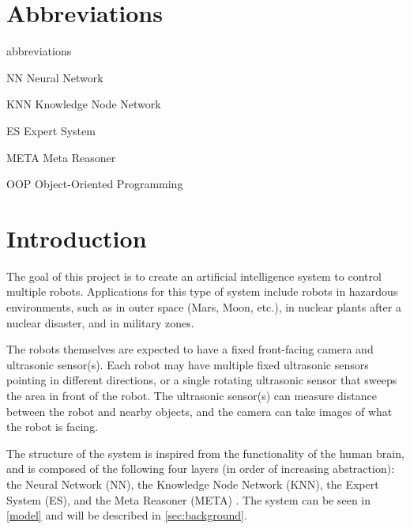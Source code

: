 \documentclass[titlepage,11pt]{article}
\begin{document}
\clearpage
\tableofcontents

\listoffigures
\listoftables
\lstlistoflistings
\clearpage

\twocolumn

\section*{Abbreviations}

\begin{labeling}{abbreviations}
\item [NN] Neural Network
\item [KNN] Knowledge Node Network
\item [ES] Expert System
\item [META] Meta Reasoner
\item [OOP] Object-Oriented Programming
\end{labeling}

\section{Introduction} \label{sec:intro}

The goal of this project is to create an artificial intelligence system to control multiple robots. Applications for this type of system include robots in hazardous environments, such as in outer space (Mars, Moon, etc.), in nuclear plants after a nuclear disaster, and in military zones.

The robots themselves are expected to have a fixed front-facing camera and ultrasonic sensor(s). Each robot may have multiple fixed ultrasonic sensors pointing in different directions, or a single rotating ultrasonic sensor that sweeps the area in front of the robot. The ultrasonic sensor(s) can measure distance between the robot and nearby objects, and the camera can take images of what the robot is facing.

The structure of the system is inspired from the functionality of the human brain, and is composed of the following four layers (in order of increasing abstraction): the Neural Network (NN), the Knowledge Node Network (KNN), the Expert System (ES), and the Meta Reasoner (META) \cite{vybihal-model}. The system can be seen in \autoref{model} and will be described in \autoref{sec:background}.
\end{document}
